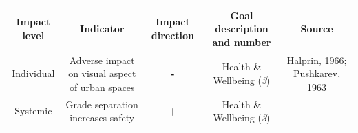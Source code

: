 \documentclass[
]{book}
\begin{document}
\begin{longtable}[]{@{}ccccc@{}}
\toprule
\begin{minipage}[b]{0.17\columnwidth}\centering
Impact level\strut
\end{minipage} & \begin{minipage}[b]{0.16\columnwidth}\centering
Indicator\strut
\end{minipage} & \begin{minipage}[b]{0.17\columnwidth}\centering
Impact direction\strut
\end{minipage} & \begin{minipage}[b]{0.17\columnwidth}\centering
Goal description and number\strut
\end{minipage} & \begin{minipage}[b]{0.17\columnwidth}\centering
Source\strut
\end{minipage}\tabularnewline
\midrule
\endhead
\begin{minipage}[t]{0.17\columnwidth}\centering
Individual\strut
\end{minipage} & \begin{minipage}[t]{0.16\columnwidth}\centering
Adverse impact on visual aspect of urban spaces\strut
\end{minipage} & \begin{minipage}[t]{0.17\columnwidth}\centering
\textbf{-}\strut
\end{minipage} & \begin{minipage}[t]{0.17\columnwidth}\centering
Health \& Wellbeing (\emph{3})\strut
\end{minipage} & \begin{minipage}[t]{0.17\columnwidth}\centering
Halprin, 1966; Pushkarev, 1963\strut
\end{minipage}\tabularnewline
\begin{minipage}[t]{0.17\columnwidth}\centering
Systemic\strut
\end{minipage} & \begin{minipage}[t]{0.16\columnwidth}\centering
Grade separation increases safety\strut
\end{minipage} & \begin{minipage}[t]{0.17\columnwidth}\centering
\textbf{+}\strut
\end{minipage} & \begin{minipage}[t]{0.17\columnwidth}\centering
Health \& Wellbeing (\emph{3})\strut
\end{minipage} & \begin{minipage}[t]{0.17\columnwidth}\centering

\end{minipage}
\end{longtable}
\end{document}
